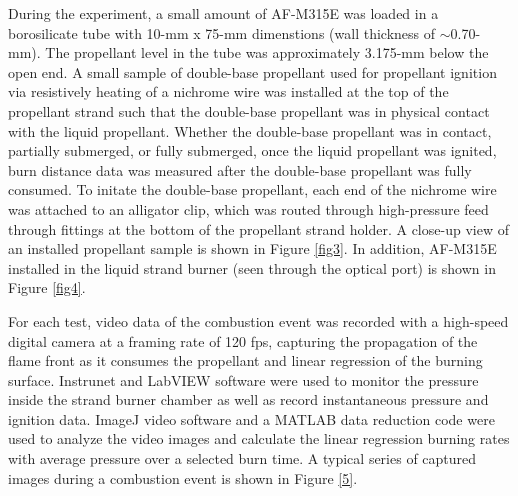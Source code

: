 \documentclass{article}
\begin{document}
During the experiment, a small amount of AF-M315E was loaded in a borosilicate tube with 10-mm x 75-mm dimenstions
(wall thickness of $\sim$0.70-mm). The propellant level in the tube was approximately 3.175-mm below the open end.
A small sample of double-base propellant used for propellant ignition via resistively heating of a nichrome wire
was installed at the top of the propellant strand such that the double-base propellant was in physical contact with
the liquid propellant. Whether the double-base propellant was in contact, partially submerged, or fully submerged,
once the liquid propellant was ignited, burn distance data was measured after the double-base propellant was fully
consumed. To initate the double-base propellant, each end of the nichrome wire was attached to an alligator clip, 
which was routed through high-pressure feed through fittings at the bottom of the propellant strand holder. A
close-up view of an installed propellant sample is shown in Figure \ref{fig3}. In addition, AF-M315E installed in
the liquid strand burner (seen through the optical port) is shown in Figure \ref{fig4}.

For each test, video data of the combustion event was recorded with a high-speed digital camera at a framing rate
of 120 fps, capturing the propagation of the flame front as it consumes the propellant and linear regression of the
burning surface. Instrunet and LabVIEW software were used to monitor the pressure inside the strand burner chamber
as well as record instantaneous pressure and ignition data. ImageJ video software and a MATLAB data reduction code
were used to analyze the video images and calculate the linear regression burning rates with average pressure over
a selected burn time. A typical series of captured images during a combustion event is shown in Figure \ref{5}.
\end{document}
